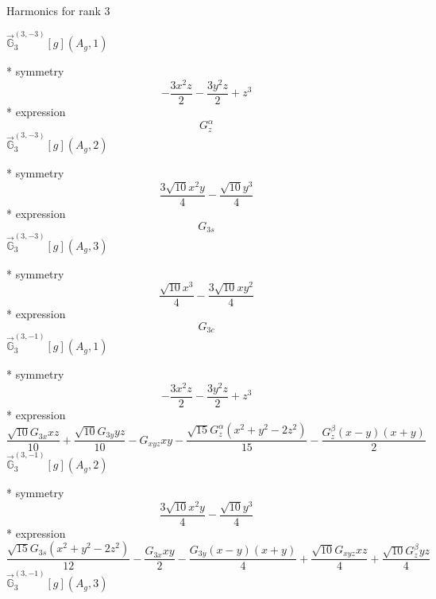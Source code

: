 \documentclass[fleqn,8pt]{jsarticle}
\begin{document}
\noindent * Harmonics for rank 3

\noindent\quad $\vec{\mathbb{G}}_{3}^{(3,-3)}[g](A_{g},1)$

\noindent\quad ** symmetry
\begin{dmath*}
- \frac{3 x^{2} z}{2} - \frac{3 y^{2} z}{2} + z^{3}
\end{dmath*}
\noindent\quad ** expression
\begin{dmath*}
G_{z}^{\alpha}
\end{dmath*}
\noindent\quad $\vec{\mathbb{G}}_{3}^{(3,-3)}[g](A_{g},2)$

\noindent\quad ** symmetry
\begin{dmath*}
\frac{3 \sqrt{10} x^{2} y}{4} - \frac{\sqrt{10} y^{3}}{4}
\end{dmath*}
\noindent\quad ** expression
\begin{dmath*}
G_{3s}
\end{dmath*}
\noindent\quad $\vec{\mathbb{G}}_{3}^{(3,-3)}[g](A_{g},3)$

\noindent\quad ** symmetry
\begin{dmath*}
\frac{\sqrt{10} x^{3}}{4} - \frac{3 \sqrt{10} x y^{2}}{4}
\end{dmath*}
\noindent\quad ** expression
\begin{dmath*}
G_{3c}
\end{dmath*}
\noindent\quad $\vec{\mathbb{G}}_{3}^{(3,-1)}[g](A_{g},1)$

\noindent\quad ** symmetry
\begin{dmath*}
- \frac{3 x^{2} z}{2} - \frac{3 y^{2} z}{2} + z^{3}
\end{dmath*}
\noindent\quad ** expression
\begin{dmath*}
\frac{\sqrt{10} G_{3x} x z}{10} + \frac{\sqrt{10} G_{3y} y z}{10} - G_{xyz} x y - \frac{\sqrt{15} G_{z}^{\alpha} \left(x^{2} + y^{2} - 2 z^{2}\right)}{15} - \frac{G_{z}^{\beta} \left(x - y\right) \left(x + y\right)}{2}
\end{dmath*}
\noindent\quad $\vec{\mathbb{G}}_{3}^{(3,-1)}[g](A_{g},2)$

\noindent\quad ** symmetry
\begin{dmath*}
\frac{3 \sqrt{10} x^{2} y}{4} - \frac{\sqrt{10} y^{3}}{4}
\end{dmath*}
\noindent\quad ** expression
\begin{dmath*}
\frac{\sqrt{15} G_{3s} \left(x^{2} + y^{2} - 2 z^{2}\right)}{12} - \frac{G_{3x} x y}{2} - \frac{G_{3y} \left(x - y\right) \left(x + y\right)}{4} + \frac{\sqrt{10} G_{xyz} x z}{4} + \frac{\sqrt{10} G_{z}^{\beta} y z}{4}
\end{dmath*}
\noindent\quad $\vec{\mathbb{G}}_{3}^{(3,-1)}[g](A_{g},3)$
\end{document}
